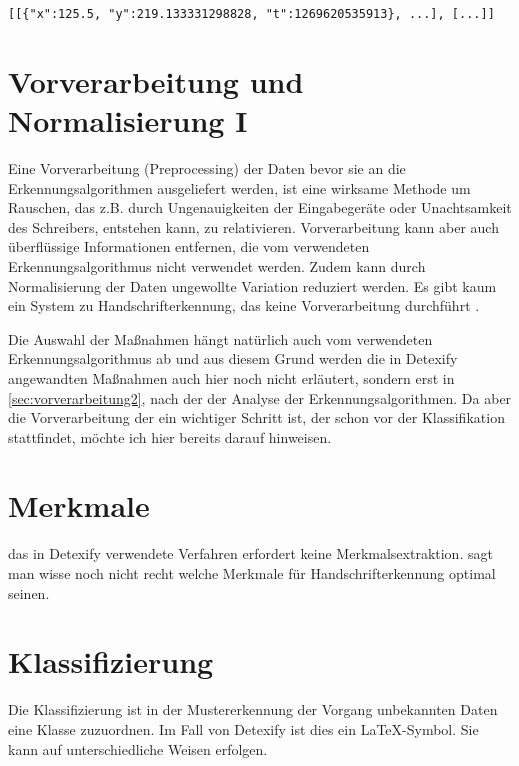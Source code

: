\lstinline![[{"x":125.5, "y":219.133331298828, "t":1269620535913}, ...], [...]]!

\section{Vorverarbeitung und Normalisierung I}
\label{sec:vorverarbeitung}

Eine Vorverarbeitung (Preprocessing) der Daten bevor sie an die Erkennungsalgorithmen ausgeliefert werden, ist eine wirksame Methode um Rauschen, das z.B. durch Ungenauigkeiten der Eingabegeräte oder Unachtsamkeit des Schreibers, entstehen kann, zu relativieren. Vorverarbeitung kann aber auch überflüssige Informationen entfernen, die vom verwendeten Erkennungsalgorithmus nicht verwendet werden. Zudem kann durch Normalisierung der Daten ungewollte Variation reduziert werden. Es gibt kaum ein System zu Handschrifterkennung, das keine Vorverarbeitung durchführt \cite{Jaeger:2003p1097,Plamondon:2000p10303,Tappert:1990p10302}.

Die Auswahl der Maßnahmen hängt natürlich auch vom verwendeten Erkennungsalgorithmus ab und aus diesem Grund werden die in Detexify angewandten Maßnahmen auch hier noch nicht erläutert, sondern erst in \ref{sec:vorverarbeitung2}, nach der der Analyse der Erkennungsalgorithmen. Da aber die Vorverarbeitung der ein wichtiger Schritt ist, der schon vor der Klassifikation stattfindet, möchte ich hier bereits darauf hinweisen.

\section{Merkmale} \label{sec:merkmale}

\TODO das in Detexify verwendete Verfahren erfordert keine Merkmalsextraktion.
\citet{Xie:2007p11427} sagt man wisse noch nicht recht welche Merkmale für Handschrifterkennung optimal seinen.


\section{Klassifizierung} 

\label{sec:klassifizierung}

Die Klassifizierung ist in der Mustererkennung der Vorgang unbekannten Daten eine Klasse zuzuordnen. Im Fall von Detexify ist dies ein \LaTeX-Symbol. Sie kann auf unterschiedliche Weisen erfolgen.

